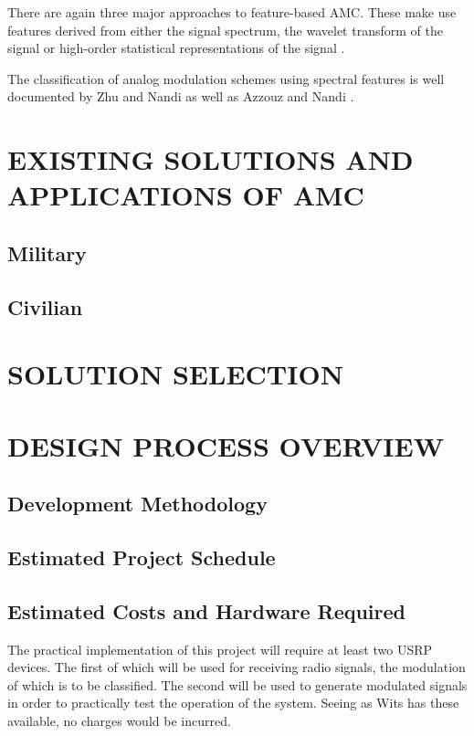 \documentclass[10pt,twocolumn]{witseiepaper}
\begin{document}
	There are again three major approaches to feature-based AMC. These make use features derived from either the signal spectrum, the wavelet transform of the signal or high-order statistical representations of the signal \cite{zhu2014automatic}. 
	
	The classification of analog modulation schemes using spectral features is well documented by Zhu and Nandi \cite{zhu2014automatic} as well as Azzouz and Nandi \cite{azzouz2013automatic}.
	

\section{EXISTING SOLUTIONS AND APPLICATIONS OF AMC}
	\subsection{Military}
	\subsection{Civilian}

\section{SOLUTION SELECTION}

\section{DESIGN PROCESS OVERVIEW}
	\subsection{Development Methodology}
	\subsection{Estimated Project Schedule}
	\subsection{Estimated Costs and Hardware Required}
		The practical implementation of this project will require at least two USRP devices. The first of which will be used for receiving radio signals, the modulation of which is to be classified. The second will be used to generate modulated signals in order to practically test the operation of the system. Seeing as Wits has these available, no charges would be incurred.
\end{document}
